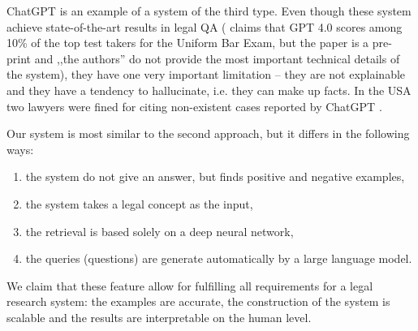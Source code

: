 ChatGPT \cite{chung2022scaling} is an example of a system of the third type. Even though these system achieve 
state-of-the-art results in legal QA (\cite{openai2023gpt4} claims that GPT 4.0 scores among 10\% of the top test takers 
for the Uniform Bar Exam, but the paper is a pre-print and ,,the authors'' do not provide the most important technical details
of the system), they have one very important limitation -- they are not explainable and they have a 
tendency to hallucinate, i.e. they can make up facts. In the USA two lawyers were fined for citing non-existent cases
reported by ChatGPT \cite{ap2023lawyers}.

Our system is most similar to the second approach, but it differs in the following ways:
\begin{enumerate}
    \item the system do not give an answer, but finds positive and negative examples,
    \item the system takes a legal concept as the input,
    \item the retrieval is based solely on a deep neural network,
    \item the queries (questions) are generate automatically by a large language model.
\end{enumerate}
We claim that these feature allow for fulfilling all requirements for a legal research system: the examples are accurate,
the construction of the system is scalable and the results are interpretable on the human level.

%

